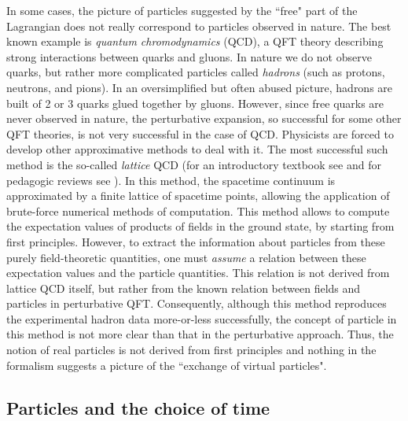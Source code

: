 \documentclass[12pt]{article}
\begin{document}
In some cases, the picture of particles suggested by the 
``free" part of the Lagrangian does not really correspond 
to particles observed in nature. The best known 
example is {\em quantum chromodynamics} (QCD), a QFT theory 
describing strong interactions between quarks and gluons.
In nature we do not observe quarks, but rather more complicated
particles called {\em hadrons} (such as protons, neutrons, 
and pions). In an oversimplified but often abused picture, 
hadrons are built of 2 or 3 quarks glued together
by gluons. However, since free quarks are never observed in nature,
the perturbative expansion, so successful for some other 
QFT theories, is not very successful in the case of QCD.
Physicists are forced to develop other approximative 
methods to deal with it. The most successful such method 
is the so-called {\em lattice} QCD (for an introductory 
textbook see \cite{creutz} and for pedagogic reviews
see \cite{davies,sharpe}). In this method, the spacetime 
continuum is approximated by a finite lattice
of spacetime points, allowing the application 
of brute-force numerical methods of computation.
This method allows to compute the expectation values of 
products of fields in the ground state, by starting from first 
principles. However, to extract the information about 
particles from these purely field-theoretic quantities, one must 
{\em assume} a relation between these expectation values
and the particle quantities. This relation is not derived 
from lattice QCD itself, but rather from the known 
relation between fields and particles in perturbative QFT.  
Consequently, although this method reproduces the experimental
hadron data more-or-less successfully, 
the concept of particle in this method is 
not more clear than that in the perturbative approach.
Thus, the notion of real particles
is not derived from first principles
and nothing in the formalism 
suggests a picture of the ``exchange of virtual particles".         

\subsection{Particles and the choice of time}
\end{document}
